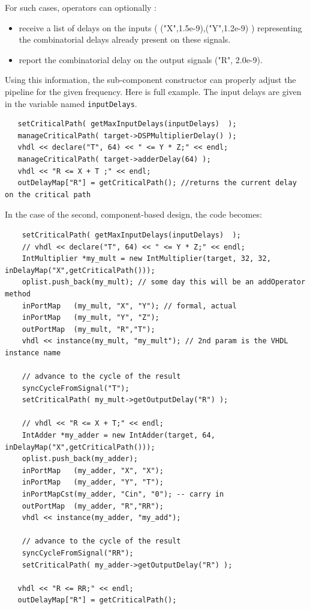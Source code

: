 \documentclass{article}
\begin{document}
For such cases, operators can optionally :
\begin{itemize}
	\item receive a list of delays on the inputs ( ("X",1.5e-9),("Y",1.2e-9) ) representing
	the combinatorial delays already present on these signals.
	\item report the combinatorial delay on the output signals ("R", 2.0e-9).
\end{itemize}

Using this information, the sub-component constructor can properly
adjust the pipeline for the given frequency.  Here is full example. The input
delays are given in the variable named \verb!inputDelays!. 

\begin{verbatim}
   setCriticalPath( getMaxInputDelays(inputDelays)  );
   manageCriticalPath( target->DSPMultiplierDelay() );
   vhdl << declare("T", 64) << " <= Y * Z;" << endl;
   manageCriticalPath( target->adderDelay(64) );
   vhdl << "R <= X + T ;" << endl;
   outDelayMap["R"] = getCriticalPath(); //returns the current delay on the critical path
\end{verbatim}

In the case of the second, component-based design, the code becomes:

\begin{verbatim}
	setCriticalPath( getMaxInputDelays(inputDelays)  );
	// vhdl << declare("T", 64) << " <= Y * Z;" << endl;
	IntMultiplier *my_mult = new IntMultiplier(target, 32, 32, inDelayMap("X",getCriticalPath()));
	oplist.push_back(my_mult); // some day this will be an addOperator method
	inPortMap   (my_mult, "X", "Y"); // formal, actual
	inPortMap   (my_mult, "Y", "Z");
	outPortMap  (my_mult, "R","T");
	vhdl << instance(my_mult, "my_mult"); // 2nd param is the VHDL instance name

	// advance to the cycle of the result
	syncCycleFromSignal("T"); 
	setCriticalPath( my_mult->getOutputDelay("R") );
	
	// vhdl << "R <= X + T;" << endl;
	IntAdder *my_adder = new IntAdder(target, 64, inDelayMap("X",getCriticalPath()));
	oplist.push_back(my_adder);
	inPortMap   (my_adder, "X", "X");
	inPortMap   (my_adder, "Y", "T");
	inPortMapCst(my_adder, "Cin", "0"); -- carry in
	outPortMap  (my_adder, "R","RR");
	vhdl << instance(my_adder, "my_add");

	// advance to the cycle of the result
	syncCycleFromSignal("RR"); 
	setCriticalPath( my_adder->getOutputDelay("R") );
	
   vhdl << "R <= RR;" << endl; 
   outDelayMap["R"] = getCriticalPath();
\end{verbatim}
\end{document}
